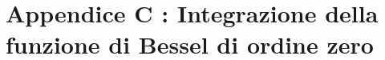 \documentclass{tufte-book} %
\theoremstyle{definition}
\theoremstyle{theorem}
\theoremstyle{plain}
\theoremstyle{remark}
\theoremstyle{remark}
\begin{document}
\chapter{Appendice C : Integrazione della funzione di Bessel di ordine zero}
\label{ch:integrazione-bessel-zero}



\mainmatter


\backmatter




%
\end{document}
